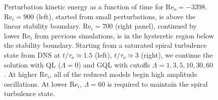 \documentclass[openacc]{rstransa}%
\newcommand{\Reyn}{\mathrm{Re}}
\begin{document}
\begin{figure}
\begin{minipage}{0.45\textwidth}
    \end{minipage}
    \caption{Perturbation kinetic energy as a function of time for $\Reyn_o=-3398$. $\Reyn_i = 900$ (left), started from small perturbations, is above the linear stability boundary. $\Reyn_i = 700$ (right panel), continued by lower $\Reyn_i$ from previous simulations, is in the hysteretic region below the stability boundary. Starting from a saturated spiral turbulence state from DNS at $t/\tau_\nu \simeq 1.5$ (left), $t/\tau_\nu \simeq 3$ (right), we continue the solution with QL ($\Lambda = 0$) and GQL with cutoffs $\Lambda = 1,3,5,10,30,60$. At higher $\Reyn_i$, all of the reduced models begin high amplitude oscillations. At lower $\Reyn_i$, $\Lambda = 60$ is required to maintain the spiral turbulence state. }
    \label{fig:ke_vs_t_rei900}
\end{figure}
\end{document}

